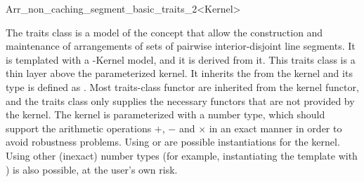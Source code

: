 
\ccRefPageBegin

\begin{ccRefClass}{Arr_non_caching_segment_basic_traits_2<Kernel>}
    
\ccDefinition 

The traits class \ccRefName{} is a model of the 
concept that allow the construction and maintenance of arrangements of
sets of pairwise interior-disjoint line segments. It is templated with a
\cgal-Kernel model, and it is derived from it. This traits class is a
thin layer above the parameterized kernel. It inherits the 
from the kernel and its  type is defined as
. Most traits-class functor are inherited from the
kernel functor, and the traits class only supplies the necessary functors
that are not provided by the kernel. The kernel is parameterized with a
number type, which should support the arithmetic operations $+$, $-$ and
$\times$ in an exact manner in order to avoid robustness problems.
Using  or  are possible
instantiations for the kernel. Using other (inexact) number types
(for example, instantiating the template with
) is also possible, at the user's own
risk.
    
 
\ccIsModel

\end{ccRefClass}
\ccRefPageEnd
